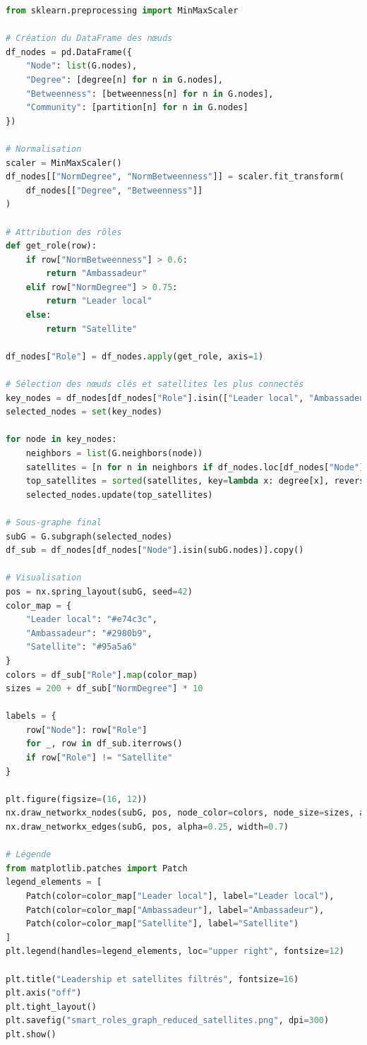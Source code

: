 \documentclass[a4paper, 12pt, twoside]{article}
\begin{document}
\begin{lstlisting}[language=Python, basicstyle=\small\ttfamily]
from sklearn.preprocessing import MinMaxScaler

# Création du DataFrame des nœuds
df_nodes = pd.DataFrame({
    "Node": list(G.nodes),
    "Degree": [degree[n] for n in G.nodes],
    "Betweenness": [betweenness[n] for n in G.nodes],
    "Community": [partition[n] for n in G.nodes]
})

# Normalisation
scaler = MinMaxScaler()
df_nodes[["NormDegree", "NormBetweenness"]] = scaler.fit_transform(
    df_nodes[["Degree", "Betweenness"]]
)

# Attribution des rôles
def get_role(row):
    if row["NormBetweenness"] > 0.6:
        return "Ambassadeur"
    elif row["NormDegree"] > 0.75:
        return "Leader local"
    else:
        return "Satellite"

df_nodes["Role"] = df_nodes.apply(get_role, axis=1)

# Sélection des nœuds clés et satellites les plus connectés
key_nodes = df_nodes[df_nodes["Role"].isin(["Leader local", "Ambassadeur"])]["Node"]
selected_nodes = set(key_nodes)

for node in key_nodes:
    neighbors = list(G.neighbors(node))
    satellites = [n for n in neighbors if df_nodes.loc[df_nodes["Node"] == n, "Role"].values[0] == "Satellite"]
    top_satellites = sorted(satellites, key=lambda x: degree[x], reverse=True)[:20]
    selected_nodes.update(top_satellites)

# Sous-graphe final
subG = G.subgraph(selected_nodes)
df_sub = df_nodes[df_nodes["Node"].isin(subG.nodes)].copy()

# Visualisation
pos = nx.spring_layout(subG, seed=42)
color_map = {
    "Leader local": "#e74c3c",
    "Ambassadeur": "#2980b9",
    "Satellite": "#95a5a6"
}
colors = df_sub["Role"].map(color_map)
sizes = 200 + df_sub["NormDegree"] * 10

labels = {
    row["Node"]: row["Role"]
    for _, row in df_sub.iterrows()
    if row["Role"] != "Satellite"
}

plt.figure(figsize=(16, 12))
nx.draw_networkx_nodes(subG, pos, node_color=colors, node_size=sizes, alpha=0.9)
nx.draw_networkx_edges(subG, pos, alpha=0.25, width=0.7)

# Légende
from matplotlib.patches import Patch
legend_elements = [
    Patch(color=color_map["Leader local"], label="Leader local"),
    Patch(color=color_map["Ambassadeur"], label="Ambassadeur"),
    Patch(color=color_map["Satellite"], label="Satellite")
]
plt.legend(handles=legend_elements, loc="upper right", fontsize=12)

plt.title("Leadership et satellites filtrés", fontsize=16)
plt.axis("off")
plt.tight_layout()
plt.savefig("smart_roles_graph_reduced_satellites.png", dpi=300)
plt.show()
\end{lstlisting}
\end{document}
